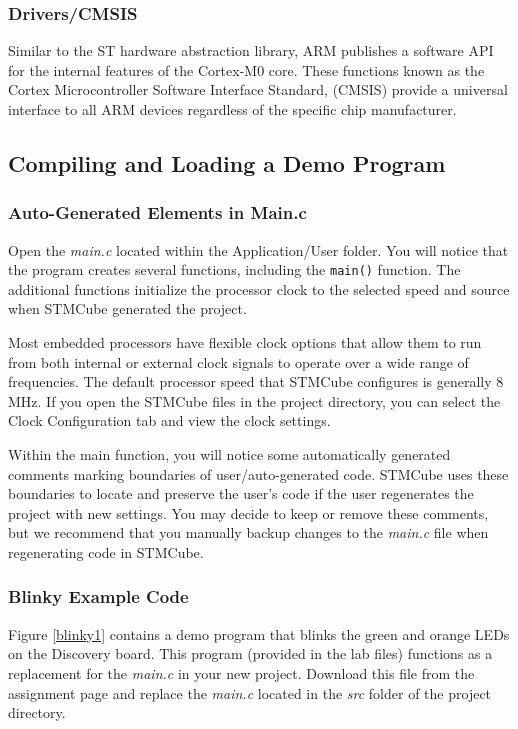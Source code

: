 \documentclass[11pt,fleqn]{book} %
\begin{document}
\subsubsection*{Drivers/CMSIS}
Similar to the ST hardware abstraction library, ARM publishes a software API for the internal features of the Cortex-M0 core. These functions known as the Cortex Microcontroller Software Interface Standard, (CMSIS) provide a universal interface to all ARM devices regardless of the specific chip manufacturer. 

\subsection{Compiling and Loading a Demo Program }
\subsubsection{Auto-Generated Elements in Main.c}
Open the \textit{main.c} located within the Application/User folder. You will notice that the program creates several functions, including the  \texttt{main()} function. The additional functions initialize the processor clock to the selected speed and source when STMCube generated the project. 

Most embedded processors have flexible clock options that allow them to run from both internal or external clock signals to operate over a wide range of frequencies. The default processor speed that STMCube configures is generally 8 MHz. If you open the STMCube files in the project directory, you can select the Clock Configuration tab and view the clock settings.

Within the main function, you will notice some automatically generated comments marking boundaries of user/auto-generated code. STMCube uses these boundaries to locate and preserve the user's code if the user regenerates the project with new settings. You may decide to keep or remove these comments, but we recommend that you manually backup changes to the \textit{main.c} file when regenerating code in STMCube. 

\subsubsection{Blinky Example Code}
Figure \vref{blinky1} contains a demo program that blinks the green and orange LEDs on the Discovery board. This program (provided in the lab files) functions as a replacement for the \textit{main.c} in your new project. Download this file from the assignment page and replace the \textit{main.c} located in the \textit{src} folder of the project directory. 
\end{document}
